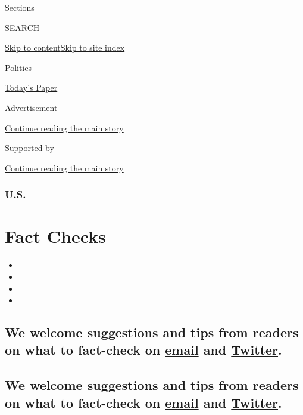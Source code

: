 Sections

SEARCH

\protect\hyperlink{site-content}{Skip to
content}\protect\hyperlink{site-index}{Skip to site index}

\href{https://www.nytimes3xbfgragh.onion/section/politics}{Politics}

\href{https://myaccount.nytimes3xbfgragh.onion/auth/login?response_type=cookie\&client_id=vi}{}

\href{https://www.nytimes3xbfgragh.onion/section/todayspaper}{Today's
Paper}

Advertisement

\protect\hyperlink{after-top}{Continue reading the main story}

Supported by

\protect\hyperlink{after-sponsor}{Continue reading the main story}

\hypertarget{us}{%
\subsubsection{\texorpdfstring{\href{/section/us}{U.S.}}{U.S.}}\label{us}}

\hypertarget{fact-checks}{%
\section{Fact Checks}\label{fact-checks}}

\begin{itemize}
\item
\item
\item
\item
\end{itemize}

\hypertarget{we-welcome-suggestions-and-tips-from-readers-on-what-to-fact-check-on-email-and-twitter}{%
\subsection{\texorpdfstring{We welcome suggestions and tips from readers
on what to fact-check on \href{mailto:factcheck@NYTimes.com}{email} and
\href{https://twitter.com/ylindaqiu}{Twitter}.}{We welcome suggestions and tips from readers on what to fact-check on email and Twitter.}}\label{we-welcome-suggestions-and-tips-from-readers-on-what-to-fact-check-on-email-and-twitter}}

\hypertarget{we-welcome-suggestions-and-tips-from-readers-on-what-to-fact-check-on-email-and-twitter-1}{%
\subsection{\texorpdfstring{We welcome suggestions and tips from readers
on what to fact-check on \href{mailto:factcheck@NYTimes.com}{email} and
\href{https://twitter.com/ylindaqiu}{Twitter}.}{We welcome suggestions and tips from readers on what to fact-check on email and Twitter.}}\label{we-welcome-suggestions-and-tips-from-readers-on-what-to-fact-check-on-email-and-twitter-1}}

